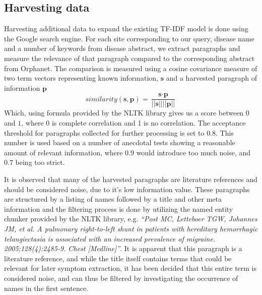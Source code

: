 \documentclass[10pt,letterpaper,final]{article}
\begin{document}
\subsection{Harvesting data}
Harvesting additional data to expand the existing TF-IDF model is done
using the Google search engine. For each site corresponding to our
query, disease name and a number of keywords from disease abstract, we
extract paragraphs and measure the relevance of that paragraph compared
to the corresponding abstract from Orphanet. The comparison is measured
using a cosine covariance measure of two term vectors representing
known information, $\textbf{s}$ and a harvested paragraph of information
$\textbf{p}$
\[
similarity(\textbf{s}, \textbf{p}) = \frac{\textbf{s} \cdot \textbf{p}}{||\textbf{s}|| ||\textbf{p}||}
\]
Which, using formula provided by the NLTK library gives us a score
between $0$ and $1$, where 0 is complete correlation and 1 is no
correlation. The acceptance threshold for paragraphs collected for
further processing is set to $0.8$. This number is used based on a
number of anecdotal tests showing a reasonable amount of relevant
information, where $0.9$ would introduce too much noise, and $0.7$
being too strict.

It is observed that many of the harvested paragraphs are literature
references and should be considered noise, due to it's low information
value.
These paragraphs are structured by a listing of names followed by a
title and other meta information and the filtering process is done by
utilizing the named entity chunker provided by the NLTK library, e.g.
\textit{``Post MC, Letteboer TGW, Johannes JM, et al. A pulmonary
right-to-left shunt in patients with hereditary hemorrhagic
telangiectasia is associated with an increased prevalence of migraine.
2005;128(4):2485-9. Chest [Medline]''}. It is apparent that this paragraph
is a literature reference, and while the title itself contains terms
that could be relevant for later symptom extraction, it has been decided
that this entire term is considered noise, and can thus be filtered by
investigating the occurrence of names in the first sentence.



\end{document}
